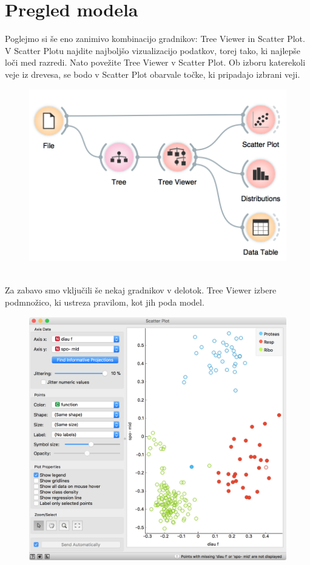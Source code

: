 \chapter{Pregled modela}
\label{ch:pregled-modela}

Poglejmo si še eno zanimivo kombinacijo gradnikov: Tree Viewer in Scatter Plot. V Scatter Plotu najdite najboljšo vizualizacijo podatkov, torej tako, ki najlepše loči med razredi. Nato povežite Tree Viewer v Scatter Plot. Ob izboru katerekoli veje iz drevesa, se bodo v Scatter Plot obarvale točke, ki pripadajo izbrani veji.

\begin{figure}[h]
    \includegraphics[width=0.8\linewidth]{workflow.png}
    \caption{$\;$}
\end{figure}

Za zabavo smo vključili še nekaj gradnikov v delotok. Tree Viewer izbere podmnožico, ki ustreza pravilom, kot jih poda model.

\begin{figure}[h]
    \includegraphics[width=0.95\linewidth]{scatterplot.png}
    \caption{$\;$}
\end{figure}